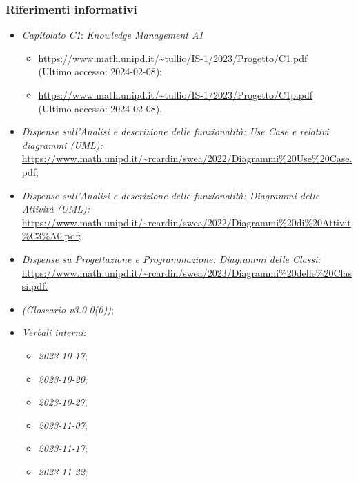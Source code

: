 \documentclass[10pt, a4paper]{article}
\begin{document}
\subsubsection{Riferimenti informativi}
\begin{itemize}
    \item \textit{Capitolato C1}: \textit{Knowledge Management AI}
    \begin{itemize}
        \item \url{https://www.math.unipd.it/~tullio/IS-1/2023/Progetto/C1.pdf}\\
        (Ultimo accesso: 2024-02-08);
        \item \url{https://www.math.unipd.it/~tullio/IS-1/2023/Progetto/C1p.pdf}\\
        (Ultimo accesso: 2024-02-08).
    \end{itemize}
    \item \textit{Dispense sull'Analisi e descrizione delle funzionalità: Use Case e relativi diagrammi (UML):}\\
    \href{https://www.math.unipd.it/~rcardin/swea/2022/Diagrammi%20Use%20Case.pdf}{https://www.math.unipd.it/\textasciitilde rcardin/swea/2022/Diagrammi\%20Use\%20Case.pdf;}
    \item \textit{Dispense sull'Analisi e descrizione delle funzionalità: Diagrammi delle Attività (UML):}\\
    \href{https://www.math.unipd.it/~rcardin/swea/2022/Diagrammi%20di%20Attivit%C3%A0.pdf}{https://www.math.unipd.it/\textasciitilde rcardin/swea/2022/Diagrammi\%20di\%20Attivit\%C3\%A0.pdf;}
    \item \textit{Dispense su Progettazione e Programmazione: Diagrammi delle Classi:}\\
    \href{https://www.math.unipd.it/~rcardin/swea/2023/Diagrammi%20delle%20Classi.pdf}{https://www.math.unipd.it/\textasciitilde rcardin/swea/2023/Diagrammi\%20delle\%20Classi.pdf.}
    \item \textit{(Glossario v3.0.0(0))};
    \item \textit{Verbali interni:}
        \begin{itemize}
            \item \textit{2023-10-17};
            \item \textit{2023-10-20};
            \item \textit{2023-10-27};
            \item \textit{2023-11-07};
            \item \textit{2023-11-17};
            \item \textit{2023-11-22};

\end{itemize}
\end{itemize}
\end{document}
